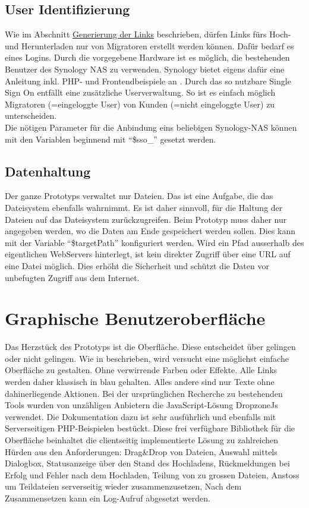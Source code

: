 \subsection{User Identifizierung}
Wie im Abschnitt \hyperref[subsec:Links]{Generierung der Links} beschrieben, dürfen Links fürs Hoch- und Herunterladen nur 
von Migratoren erstellt werden können. Dafür bedarf es eines Logins. Durch die vorgegebene Hardware ist es möglich, 
die bestehenden Benutzer des Synology NAS zu verwenden. Synology bietet eigens dafür eine Anleitung inkl. PHP- und Frontendbeispiele an \cite{Synology}.
Durch das so nutzbare Single Sign On entfällt eine zusätzliche Userverwaltung. 
So ist es einfach möglich Migratoren (=eingeloggte User) von Kunden (=nicht eingeloggte User) zu unterscheiden.
\\ 
Die nötigen Parameter für die Anbindung eins beliebigen Synology-NAS können mit den Variablen beginnend mit ``\$sso\_'' gesetzt werden.

\subsection{Datenhaltung}
Der ganze Prototyps verwaltet nur Dateien. Das ist eine Aufgabe, die das Dateisystem ebenfalls wahrnimmt.
Es ist daher sinnvoll, für die Haltung der Dateien auf das Dateisystem zurückzugreifen. 
Beim Prototyp muss daher nur angegeben werden, wo die Daten am Ende gespeichert werden sollen. 
Dies kann mit der Variable ``\$targetPath'' konfiguriert werden. 
Wird ein Pfad ausserhalb des eigentlichen WebServers hinterlegt, ist kein direkter Zugriff über eine URL auf eine Datei möglich.
Dies erhöht die Sicherheit und schützt die Daten vor unbefugten Zugriff aus dem Internet.

\clearpage
\section{Graphische Benutzeroberfläche}
Das Herzstück des Prototyps ist die Oberfläche. Diese entscheidet über gelingen oder nicht gelingen.
Wie in \cite{Butz} beschrieben, wird versucht eine möglichst einfache Oberfläche zu gestalten. Ohne verwirrende Farben oder Effekte.
Alle Links werden daher klassisch in blau gehalten. Alles andere sind nur Texte ohne dahinerliegende Aktionen.
Bei der ursprünglichen Recherche zu bestehenden Tools wurden von unzähligen Anbietern die JavaScript-Lösung DropzoneJs verwendet.
Die Dokumentation \cite{DropzoneJs} dazu ist sehr ausführlich und ebenfalls mit Serverseitigen PHP-Beispielen bestückt. 
Diese frei verfügbare Bibliothek für die Oberfläche beinhaltet die clientseitig implementierte Lösung zu zahlreichen Hürden aus den Anforderungen:
Drag\&Drop von Dateien, 
Auswahl mittels Dialogbox, 
Statusanzeige über den Stand des Hochladens,
Rückmeldungen bei Erfolg und Fehler nach dem Hochladen,
Teilung von zu grossen Dateien, 
Anstoss um Teildateien serverseitig wieder zusammenzusetzen,
Nach dem Zusammensetzen kann ein Log-Aufruf abgesetzt werden.

